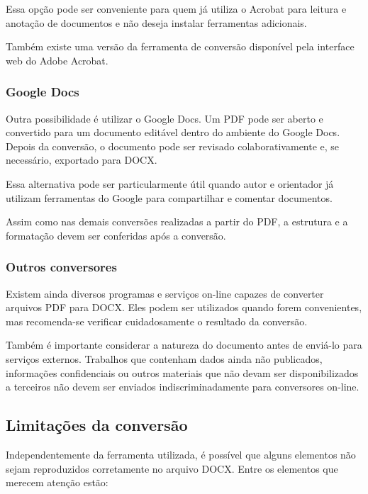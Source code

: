 Essa opção pode ser conveniente para quem já utiliza o Acrobat para
leitura e anotação de documentos e não deseja instalar ferramentas
adicionais.

Também existe uma versão da ferramenta de conversão disponível pela
interface web do Adobe Acrobat.

\subsubsection{Google Docs}
\label{sbsec:conversao_google_docs}

Outra possibilidade é utilizar o Google Docs. Um PDF pode ser aberto e
convertido para um documento editável dentro do ambiente do Google
Docs. Depois da conversão, o documento pode ser revisado
colaborativamente e, se necessário, exportado para DOCX.

Essa alternativa pode ser particularmente útil quando autor e
orientador já utilizam ferramentas do Google para compartilhar e
comentar documentos.

Assim como nas demais conversões realizadas a partir do PDF, a
estrutura e a formatação devem ser conferidas após a conversão.

\subsubsection{Outros conversores}
\label{sbsec:outros_conversores}

Existem ainda diversos programas e serviços on-line capazes de
converter arquivos PDF para DOCX. Eles podem ser utilizados quando
forem convenientes, mas recomenda-se verificar cuidadosamente o
resultado da conversão.

Também é importante considerar a natureza do documento antes de
enviá-lo para serviços externos. Trabalhos que contenham dados ainda
não publicados, informações confidenciais ou outros materiais que não
devam ser disponibilizados a terceiros não devem ser enviados
indiscriminadamente para conversores on-line.

\subsection{Limitações da conversão}
\label{ssec:limitacoes_conversao}

Independentemente da ferramenta utilizada, é possível que alguns
elementos não sejam reproduzidos corretamente no arquivo DOCX. Entre
os elementos que merecem atenção estão:

